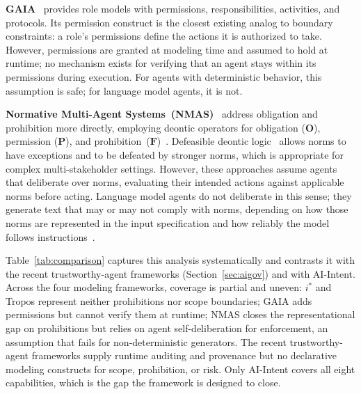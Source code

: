 \documentclass[runningheads]{llncs}
\begin{document}
\textbf{GAIA}~\cite{wooldridge2000gaia} provides role models with
permissions, responsibilities, activities, and protocols. Its permission
construct is the closest existing analog to boundary constraints: a
role's permissions define the actions it is authorized to take. However,
permissions are granted at modeling time and assumed to hold at runtime;
no mechanism exists for verifying that an agent stays within its
permissions during execution. For agents with deterministic behavior,
this assumption is safe; for language model agents, it is not.

\textbf{Normative Multi-Agent Systems~(NMAS)}~\cite{governatori2005meeting,boella2006introduction,dignum1999autonomous} address obligation and
prohibition more directly, employing deontic operators for obligation
($\mathbf{O}$), permission ($\mathbf{P}$), and
prohibition~($\mathbf{F}$)~\cite{vonwright1951essay}. Defeasible deontic
logic~\cite{governatori2005meeting} allows norms to have exceptions and
to be defeated by stronger norms, which is appropriate for complex
multi-stakeholder settings. However, these approaches assume agents that
deliberate over norms, evaluating their intended actions against
applicable norms before acting. Language model agents do not deliberate
in this sense; they generate text that may or may not comply with norms,
depending on how those norms are represented in the input specification
and how reliably the model follows
instructions~\cite{huang2023selfcorrect}.

Table~\ref{tab:comparison} captures this analysis systematically and
contrasts it with the recent trustworthy-agent frameworks
(Section~\ref{sec:aigov}) and with AI-Intent. Across the four modeling
frameworks, coverage is partial and uneven: $i^*$ and Tropos represent
neither prohibitions nor scope boundaries; GAIA adds permissions but
cannot verify them at runtime; NMAS closes the representational gap on
prohibitions but relies on agent self-deliberation for enforcement, an
assumption that fails for non-deterministic generators. The recent
trustworthy-agent frameworks supply runtime auditing and provenance but
no declarative modeling constructs for scope, prohibition, or risk. Only
AI-Intent covers all eight capabilities, which is the gap the framework
is designed to close.

\vspace{-14pt}
\end{document}
